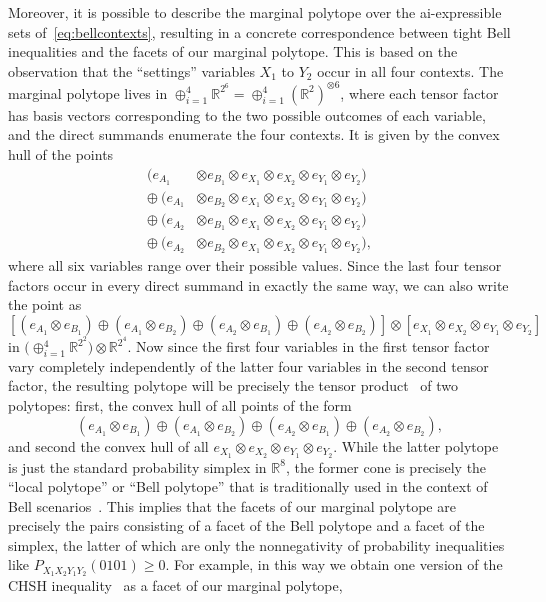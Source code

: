 \documentclass[aps,english,10pt,superscriptaddress,onecolumn,twoside,longbibliography,pra,floatfix,fleqn,nofootinbib]{revtex4-1}%
\theoremstyle{definition}
\newcounter{example}[section]
\begin{document}
Moreover, it is possible to describe the marginal polytope over the ai-expressible sets of~\cref{eq:bellcontexts}, resulting in a concrete correspondence between tight Bell inequalities and the facets of our marginal polytope. This is based on the observation that the ``settings'' variables $X_1$ to $Y_2$ occur in all four contexts. The marginal polytope lives in $\oplus_{i=1}^4 \mathbb{R}^{2^6} = \oplus_{i=1}^4 (\mathbb{R}^2)^{\otimes 6}$, where each tensor factor has basis vectors corresponding to the two possible outcomes of each variable, and the direct summands enumerate the four contexts. It is given by the convex hull of the points
\begin{align*}
	(e_{A_1} & \otimes e_{B_1} \otimes e_{X_1} \otimes e_{X_2} \otimes e_{Y_1} \otimes e_{Y_2}) \\
	\oplus\: (e_{A_1} & \otimes e_{B_2} \otimes e_{X_1} \otimes e_{X_2} \otimes e_{Y_1} \otimes e_{Y_2}) \\
	\oplus\: (e_{A_2} & \otimes e_{B_1} \otimes e_{X_1} \otimes e_{X_2} \otimes e_{Y_1} \otimes e_{Y_2}) \\
	\oplus\: (e_{A_2} & \otimes e_{B_2} \otimes e_{X_1} \otimes e_{X_2} \otimes e_{Y_1} \otimes e_{Y_2}),
\end{align*}
where all six variables range over their possible values. Since the last four tensor factors occur in every direct summand in exactly the same way, we can also write the point as
\[
	\left[ (e_{A_1} \otimes e_{B_1}) \oplus (e_{A_1} \otimes e_{B_2}) \oplus (e_{A_2} \otimes e_{B_1}) \oplus (e_{A_2} \otimes e_{B_2})\right] \otimes \left[ e_{X_1} \otimes e_{X_2} \otimes e_{Y_1} \otimes e_{Y_2}\right]
\]
in $\big(\oplus_{i=1}^4 \mathbb{R}^{2^2}\big)\otimes \mathbb{R}^{2^4}$. Now since the first four variables in the first tensor factor vary completely independently of the latter four variables in the second tensor factor, the resulting polytope will be precisely the tensor product~\cite{namioka_tensor_1969,bogart_hom_2013} of two polytopes: first, the convex hull of all points of the form
\[
	(e_{A_1} \otimes e_{B_1}) \oplus (e_{A_1} \otimes e_{B_2}) \oplus (e_{A_2} \otimes e_{B_1}) \oplus (e_{A_2} \otimes e_{B_2}),
\]
and second the convex hull of all $e_{X_1} \otimes e_{X_2} \otimes e_{Y_1} \otimes e_{Y_2}$. While the latter polytope is just the standard probability simplex in $\mathbb{R}^8$, the former cone is precisely the ``local polytope'' or ``Bell polytope'' that is traditionally used in the context of Bell scenarios~\cite[Sec.~II.B]{Brunner2013Bell}. This implies that the facets of our marginal polytope are precisely the pairs consisting of a facet of the Bell polytope and a facet of the simplex, the latter of which are only the nonnegativity of probability inequalities like $P_{X_1X_2Y_1Y_2}(0101)\geq 0$. For example, in this way we obtain one version of the CHSH inequality~\cite{CHSHOriginal} as a facet of our marginal polytope,
\end{document}
